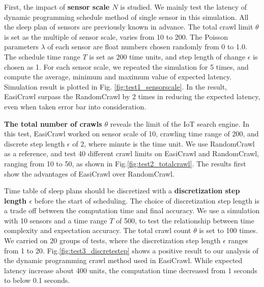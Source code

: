 \documentclass[conference]{IEEEtran}
\begin{document}

First, the impact of \textbf{sensor scale $N$} is studied.
We mainly test the latency of dynamic programming schedule method of single sensor in this simulation. 
All the sleep plan of sensors are previously known in advance.
The total crawl limit $\theta$ is set as the multiple of sensor scale, varies from 10 to 200. 
The Poisson parameters $\lambda$ of each sensor are float numbers chosen randomly from 0 to 1.0. 
The schedule time range $T$ is set as 200 time units, and step length of change $\epsilon$ is chosen as 1.
For each sensor scale, we repeated the simulation for 5 times, and compute the average, minimum and maximum value of expected latency. 
Simulation result is plotted in Fig. \ref{fig:test1_sensorscale}.
In the result, EasiCrawl surpass the RandomCrawl by 2 times in reducing the expected latency, even when taken error bar into consideration. 

\textbf{The total number of crawls $\theta$} reveals the limit of the IoT search engine.
In this test, EasiCrawl worked on sensor scale of 10, crawling time range of 200, and discrete step length $\epsilon$ of 2, where minute is the time unit.
We use RandomCrawl as a reference, and test 40 different crawl limits on EasiCrawl and RandomCrawl, ranging from 10 to 50, as shown in Fig.\ref{fig:test2_totalcrawl}.
The results first show the advantages of EasiCrawl over RandomCrawl. 

Time table of sleep plans should be discretized with a \textbf{discretization step length $\epsilon$} before the start of scheduling. 
The choice of discretization step length is a trade off between the computation time and final accuracy. 
We use a simulation with 10 sensors and a time range $T$ of 500, to test the relationship between time complexity and expectation accuracy. 
The total crawl count $\theta$ is set to 100 times.
We carried on 20 groups of tests, where the discretization step length $\epsilon$ ranges from 1 to 20.
Fig.\ref{fig:test3_discretestep} shows a positive result to our analysis of the dynamic programming crawl method used in EasiCrawl. 
While expected latency increase about 400 units, the computation time decreased from 1 seconds to below 0.1 seconds. 
\end{document}

